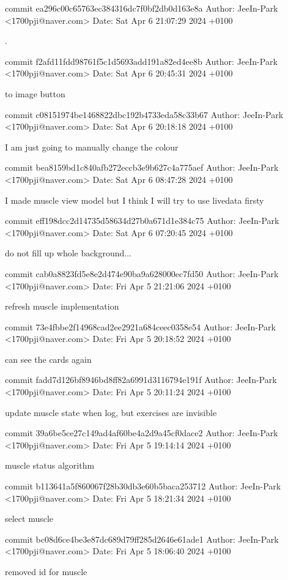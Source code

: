 commit ea296c00c65763ec384316dc7f0bf2db0d163e8a
Author: JeeIn-Park <1700pji@naver.com>
Date:   Sat Apr 6 21:07:29 2024 +0100

    .

commit f2afd11fdd98761f5c1d5693add191a82ed4ee8b
Author: JeeIn-Park <1700pji@naver.com>
Date:   Sat Apr 6 20:45:31 2024 +0100

    to image button

commit c08151974be1468822dbc192b4733eda58c33b67
Author: JeeIn-Park <1700pji@naver.com>
Date:   Sat Apr 6 20:18:18 2024 +0100

    I am just going to manually change the colour

commit bea8159bd1c840afb272eccb3e9b627c4a775aef
Author: JeeIn-Park <1700pji@naver.com>
Date:   Sat Apr 6 08:47:28 2024 +0100

    I made muscle view model but I think I will try to use livedata firsty

commit eff198dcc2d14735d58634d27b0a671d1e384c75
Author: JeeIn-Park <1700pji@naver.com>
Date:   Sat Apr 6 07:20:45 2024 +0100

    do not fill up whole background...

commit cab0a8823fd5e8e2d474e90ba9a628000ec7fd50
Author: JeeIn-Park <1700pji@naver.com>
Date:   Fri Apr 5 21:21:06 2024 +0100

    refresh muscle implementation

commit 73e4fbbe2f14968cad2ee2921a684ceec0358e54
Author: JeeIn-Park <1700pji@naver.com>
Date:   Fri Apr 5 20:18:52 2024 +0100

    can see the cards again

commit fadd7d126bf8946bd8ff82a6991d3116794e191f
Author: JeeIn-Park <1700pji@naver.com>
Date:   Fri Apr 5 20:11:24 2024 +0100

    update muscle state when log, but exercises are invisible

commit 39a6be5ce27c149ad4af60be4a2d9a45cf0dace2
Author: JeeIn-Park <1700pji@naver.com>
Date:   Fri Apr 5 19:14:14 2024 +0100

    muscle status algorithm

commit b113641a5f860067f28b30db3e60b5baca253712
Author: JeeIn-Park <1700pji@naver.com>
Date:   Fri Apr 5 18:21:34 2024 +0100

    select muscle

commit bc08d6ce4be3e87dc689d79ff285d2646e61ade1
Author: JeeIn-Park <1700pji@naver.com>
Date:   Fri Apr 5 18:06:40 2024 +0100

    removed id for muscle

